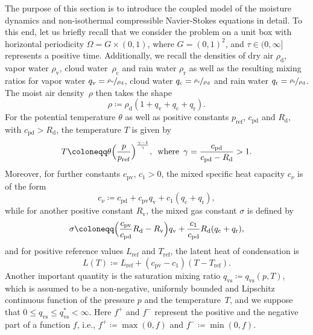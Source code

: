 \documentclass[10pt]{amsart}
\theoremstyle{plain}
\theoremstyle{definition}
\theoremstyle{thm}
\numberwithin{equation}{section}
\newcommand{\rd}{\mathrm{d}}
\newcommand{\rr}{\mathrm{r}}
\newcommand{\rv}{\mathrm{v}}
\newcommand{\rvs}{\mathrm{vs}}
\newcommand{\rc}{\mathrm{c}}
\newcommand{\rref}{\mathrm{ref}}
\newcommand{\rpd}{\mathrm{pd}}
\newcommand{\rpv}{\mathrm{pv}}
\begin{document}
The purpose of this section is to introduce the coupled model of the moisture dynamics and non-isothermal compressible Navier-Stokes equations in detail.
To this end, let us briefly recall that we consider the problem on a unit box with horizontal periodicity $\Omega = G \times (0,1)$, where $G = (0,1)^2$, and $\tau \in (0,\infty]$ represents a positive time.
Additionally, we recall the densities of dry air $\rho_\rd$, vapor water $\rho_\rv$, cloud water~$\rho_\rc$ and rain water $\rho_\rr$ as well as the resulting mixing ratios for vapor water $q_\rv = \nicefrac{\rho_\rv}{\rho_\rd}$, cloud water $q_\rc = \nicefrac{\rho_\rc}{\rho_\rd}$ and rain water $q_\rr = \nicefrac{\rho_\rr}{\rho_\rd}$.
The moist air density~$\rho$ then takes the shape
\begin{equation*}
    \rho \coloneqq \rho_\rd(1 + q_\rv + q_\rc + q_\rr).
\end{equation*}
For the potential temperature $\theta$ as well as positive constants $p_\rref$, $c_\rpd$ and $R_\rd$, with $c_\rpd > R_\rd$, the temperature $T$ is given by
\begin{equation*}
    T \coloneqq \theta \Bigl(\frac{p}{p_\rref}\Bigr)^{\frac{\gamma - 1}{\gamma}}, \enspace \text{where} \enspace \gamma = \frac{c_\rpd}{c_\rpd - R_\rd} > 1.
\end{equation*}
Moreover, for further constants $c_\rpv$, $c_1 > 0$, the mixed specific heat capacity $c_\nu$ is of the form
\begin{equation*}
    c_\nu \coloneqq c_\rpd + c_\rpv q_\rv + c_1(q_\rc + q_\rr),
\end{equation*}
while for another positive constant $R_\rv$, the mixed gas constant $\sigma$ is defined by
\begin{equation*}
    \sigma \coloneqq \Bigl(\frac{c_\rpv}{c_\rpd} R_\rd - R_\rv\Bigr) q_\rv + \frac{c_1}{c_\rpd} R_\rd(q_\rc + q_\rr),
\end{equation*} 
and for positive reference values $L_\rref$ and $T_\rref$, the latent heat of condensation is
\begin{equation*}
    L(T) \coloneqq L_\rref + (c_\rpv - c_1)(T - T_\rref).
\end{equation*}
Another important quantity is the saturation mixing ratio $q_\rvs \coloneqq q_\rvs(p,T)$, which is assumed to be a non-negative, uniformly bounded and Lipschitz continuous function of the pressure $p$ and the temperature~$T$, and we suppose that $0 \le q_\rvs \le q_\rvs^* < \infty$.
Here $f^+$ and $f^-$ represent the positive and the negative part of a function $f$, i.e., $f^+ \coloneqq \max(0,f)$ and $f^- \coloneqq \min(0,f)$.
\end{document}
